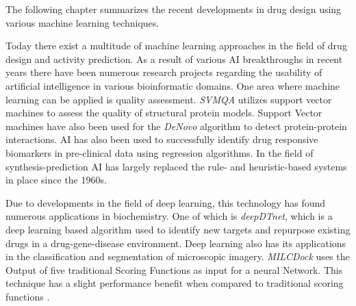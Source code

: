 The following chapter summarizes the recent developments in drug design using various machine 
learning techniques. 

Today there exist a multitude of machine learning approaches in the field of drug design and activity prediction.
As a result of various AI breakthroughs in recent years there have been numerous research projects regarding the usability of artificial intelligence
in various bioinformatic domains.
One area where machine learning can be applied is quality assessment.
\textit{SVMQA} utilizes support vector machines to assess the quality of structural protein models\cite{Manavalan2017}.
Support Vector machines have also been used for the \textit{DeNovo} algorithm to detect protein-protein interactions\cite{Eid2016}.
AI has also been used to successfully identify drug responsive biomarkers in pre-clinical data using regression algorithms\cite{Li2015}.
In the field of synthesis-prediction AI has largely replaced the rule- and heuristic-based systems in place since the 1960s\cite{Johansson2019}.

Due to developments in the field of deep learning, this technology has found numerous applications in biochemistry\cite{Chen2018}.
One of which is \textit{deepDTnet}, which is a deep learning based algorithm used to identify new targets and repurpose existing drugs in a drug-gene-disease environment\cite{Zeng}.
Deep learning also has its applications in the classification and segmentation of microscopic imagery\cite{Kraus2016}.
\textit{MILCDock} uses the Output of five traditional Scoring Functions as input for a neural Network. This technique has a slight performance benefit when compared to traditional scoring functions \cite[]{Morris2022}.
